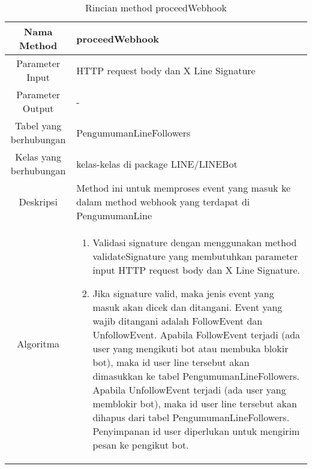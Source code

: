 \begin{center}
	\begin{table}[H]
	\caption{Rincian method proceedWebhook}
	\label{table:pengumuman-line-model-proceedwebhook}
\begin{tabular}{|c|p{11cm}|}
\hline
Nama Method 	& 	 proceedWebhook	\\
\hline
Parameter Input & HTTP request body dan X Line Signature \\
\hline
Parameter Output & - \\
\hline
Tabel yang berhubungan & PengumumanLineFollowers\\
\hline
Kelas yang berhubungan & kelas-kelas di package LINE/LINEBot \\
\hline
Deskripsi	& Method ini untuk memproses event yang masuk ke dalam method webhook yang terdapat di PengumumanLine\\
\hline
Algoritma	& \begin{enumerate}
				\item Validasi signature dengan menggunakan method validateSignature yang membutuhkan parameter input HTTP request body dan X Line Signature.
				\item Jika signature valid, maka jenis event yang masuk akan dicek dan ditangani. Event yang wajib ditangani adalah FollowEvent dan UnfollowEvent. Apabila FollowEvent terjadi (ada user yang mengikuti bot atau membuka blokir bot), maka id user line tersebut akan dimasukkan ke tabel PengumumanLineFollowers. Apabila UnfollowEvent terjadi (ada user yang memblokir bot), maka id user line tersebut akan dihapus dari tabel PengumumanLineFollowers. Penyimpanan id user diperlukan untuk mengirim pesan ke pengikut bot.
				\end{enumerate} \\
\hline
\end{tabular}
\end{table}
\end{center}

